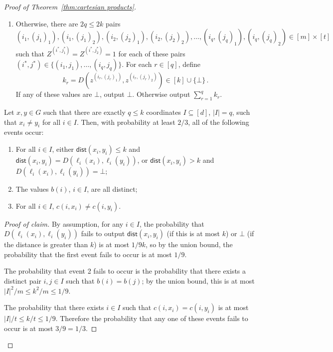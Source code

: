 \documentclass{article}
\newcommand{\dist}{\mathsf{dist}}
\newcommand{\zo}{\{0,1\}}
\begin{document}
\begin{proof}[Proof of Theorem~\ref{thm:cartesian products}]
\begin{enumerate}
$Z^{(i,j)} = 1$, output $\bot$.
\item Otherwise, there are $2q \leq 2k$ pairs
\[
(i_1, (j_1)_1), (i_1, (j_1)_2),
(i_2, (j_2)_1), (i_2, (j_2)_2), \dotsc,
(i_q, (j_q)_1), (i_q, (j_q)_2) \in [m] \times [t]
\]
such that $Z^{(i^*,j^*_1)}=Z^{(i^*,j^*_2)} = 1$ for each of these pairs $(i^*, j^*) \in \{ (i_1,
j_1), \dotsc, (i_q, j_q)\}$. 
For each $r \in [q]$, define
\[
  k_r = D(z^{(i_r, (j_r)_1)}, z^{(i_r, (j_r)_2)} ) \in [k] \cup \{\bot\} \,.
\]
If any of these values are $\bot$, output $\bot$. Otherwise output $\sum_{r=1}^q k_r$.
\end{enumerate}
\begin{claim}
\label{claim:product good events}
Let $x,y \in G$ such that there are exactly $q \leq k$ coordinates $I \subseteq [d]$, $|I|
= q$, such that $x_i \neq y_i$ for all $i \in I$.  Then, with probability at least $2/3$, all
of the following events occur:
\begin{enumerate}
\item For all $i \in I$, either $\dist(x_i, y_i) \leq k$ and $\dist(x_i, y_i)
= D(\ell_i(x_i), \ell_i(y_i))$, or $\dist(x_i, y_i) > k$ and $D(\ell_i(x_i), \ell_i(y_i)) =
\bot$;
\item The values $b(i)$, $i \in I$, are all distinct;
\item For all $i \in I$, $c(i, x_i) \neq c(i, y_i)$.
\end{enumerate}
\end{claim}
\begin{proof}[Proof of claim]
By assumption, for any $i \in I$, the probability that $D(\ell_i(x_i),\ell_i(y_i))$ fails to output
$\dist(x_i,y_i)$ (if this is at most $k$) or $\bot$ (if the distance is greater than $k$) is at most
$1/9k$, so by the union bound, the probability that the first event fails to occur is at most
$1/9$.

The probability that event 2 fails to occur is the probability that there exists a distinct pair
$i,j \in I$ such that $b(i)=b(j)$; by the union bound, this is at most $|I|^2/m \leq k^2/m \leq
1/9$.

The probability that there exists $i \in I$ such that $c(i,x_i) = c(i,y_i)$ is at most $|I|/t \leq
k/t \leq 1/9$. Therefore the probability that any one of these events fails to occur is at most $3/9
= 1/3$.
\end{proof}


\end{proof}
\end{document}
